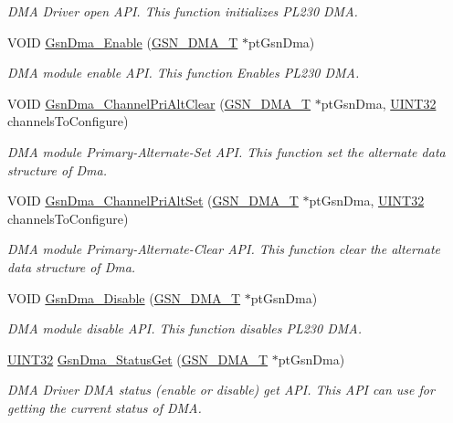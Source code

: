 \begin{DoxyCompactItemize}
\begin{DoxyCompactList}\small\item\em DMA Driver open API. This function initializes PL230 DMA. \end{DoxyCompactList}\item 
VOID \hyperlink{a00645_ga7c2e3e52f4e9a058280bb12c28bcae98}{GsnDma\_\-Enable} (\hyperlink{a00049}{GSN\_\-DMA\_\-T} $\ast$ptGsnDma)
\begin{DoxyCompactList}\small\item\em DMA module enable API. This function Enables PL230 DMA. \end{DoxyCompactList}\item 
VOID \hyperlink{a00645_ga70900a6c4c67014eb4ab3b6fb1e07e7b}{GsnDma\_\-ChannelPriAltClear} (\hyperlink{a00049}{GSN\_\-DMA\_\-T} $\ast$ptGsnDma, \hyperlink{a00660_gae1e6edbbc26d6fbc71a90190d0266018}{UINT32} channelsToConfigure)
\begin{DoxyCompactList}\small\item\em DMA module Primary-\/Alternate-\/Set API. This function set the alternate data structure of Dma. \end{DoxyCompactList}\item 
VOID \hyperlink{a00645_ga83809527ab278dc141bcbf1aff7d4261}{GsnDma\_\-ChannelPriAltSet} (\hyperlink{a00049}{GSN\_\-DMA\_\-T} $\ast$ptGsnDma, \hyperlink{a00660_gae1e6edbbc26d6fbc71a90190d0266018}{UINT32} channelsToConfigure)
\begin{DoxyCompactList}\small\item\em DMA module Primary-\/Alternate-\/Clear API. This function clear the alternate data structure of Dma. \end{DoxyCompactList}\item 
VOID \hyperlink{a00645_gae768fe52b1ab8f2cf674638e82c4a223}{GsnDma\_\-Disable} (\hyperlink{a00049}{GSN\_\-DMA\_\-T} $\ast$ptGsnDma)
\begin{DoxyCompactList}\small\item\em DMA module disable API. This function disables PL230 DMA. \end{DoxyCompactList}\item 
\hyperlink{a00660_gae1e6edbbc26d6fbc71a90190d0266018}{UINT32} \hyperlink{a00645_ga839dcf0e2fc6ddc1fa8fa3895b763da0}{GsnDma\_\-StatusGet} (\hyperlink{a00049}{GSN\_\-DMA\_\-T} $\ast$ptGsnDma)
\begin{DoxyCompactList}\small\item\em DMA Driver DMA status (enable or disable) get API. This API can use for getting the current status of DMA. \end{DoxyCompactList}\item 

\end{DoxyCompactItemize}
